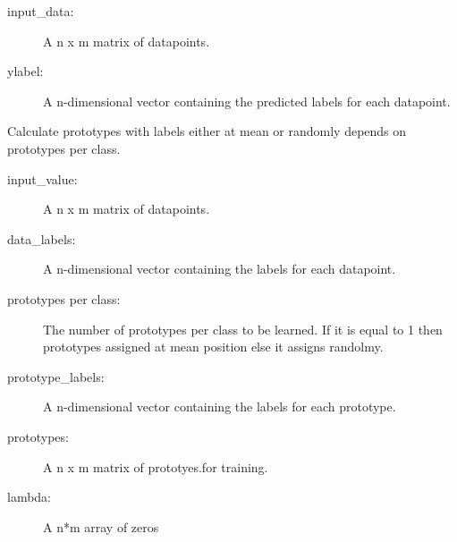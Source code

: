 \documentclass[letterpaper,10pt,english]{sphinxmanual}
\begin{document}
\begin{fulllineitems}
\begin{fulllineitems}
\begin{description}
\item[{input\_data:}] \leavevmode
A n x m matrix of datapoints.

\end{description}
\begin{description}
\item[{ylabel:}] \leavevmode
A n-dimensional vector containing the predicted labels for each
datapoint.

\end{description}

\end{fulllineitems}


\begin{fulllineitems}
\label{\detokenize{index:lmlvq_distance.LMLVQ.prt}}
Calculate prototypes with labels either at mean or randomly depends
on prototypes per class.
\begin{description}
\item[{input\_value:}] \leavevmode
A n x m matrix of datapoints.

\item[{data\_labels:}] \leavevmode
A n-dimensional vector containing the labels for each
datapoint.

\item[{prototypes per class:}] \leavevmode
The number of prototypes per class to be learned. If it is
equal to 1 then prototypes assigned at mean position
else it assigns randolmy.

\end{description}
\begin{description}
\item[{prototype\_labels:}] \leavevmode
A n-dimensional vector containing the labels for each
prototype.

\item[{prototypes:}] \leavevmode
A n x m matrix of prototyes.for training.

\item[{lambda:}] \leavevmode
A n*m array of zeros

\end{description}

\end{fulllineitems}



\end{fulllineitems}
\end{document}
